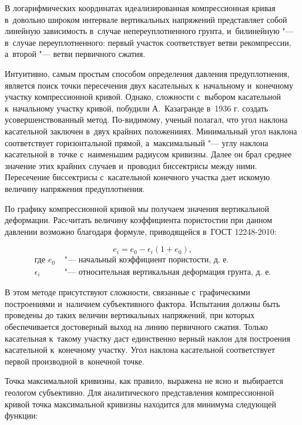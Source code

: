 В логарифмических координатах идеализированная компрессионная кривая в~довольно широком интервале вертикальных напряжений представляет собой линейную зависимость в~случае непереуплотненного грунта, и~билинейную "--- в~случае переуплотненного:
первый участок соответствует ветви рекомпрессии, а~второй "--- ветви первичного сжатия.

Интуитивно, самым простым способом определения давления предуплотнения, является поиск точки пересечения двух касательных к~начальному и~конечному участку компрессионной кривой. 
Однако, сложности с~выбором касательной к~начальному участку кривой, побудили А.~Казагранде в~1936 г. создать усовершенствованный метод. 
По-видимому, ученый полагал, что угол наклона касательной заключен в~двух крайних положенииях. 
Минимальный угол наклона соответствует горизонтальной прямой, а~максимальный "--- углу наклона касательной в~точке с~наименьшим радиусом кривизны. 
Далее он брал среднее значение этих крайних случаев и~проводил биссектрисы между ними. 
Пересечение биссектрисы с~касательной конечного участка дает искомую величину напряжения предуплотнения.

По графику компрессионной кривой мы получаем значения вертикальной деформации. Расcчитать величину коэффициента пористостии при данном давлении возможно благодаря формуле, приводящейся в~ГОСТ 12248-2010:

\begin{equation}
  \label{eq:void}
  e_i = e_0 - \epsilon_i (1+e_0),
\end{equation}
\begin{align*}
  \text{где }
  e_0 & 
  \text{ "--- начальный коэффициент пористости, д.~е.} \\
  \epsilon_i & 
  \text{ "--- относительная вертикальная деформация грунта, д.~е.}
\end{align*}


В этом методе присутствуют сложности, связанные с~графическими построениями и~наличием субъективного фактора.
Испытания должны быть проведены до таких величин вертикальных напряжений, при которых обеспечивается достоверный выход на линию первичного сжатия. 
Только касательная к~такому участку даст единственно верный наклон для построения касательной к~конечному участку.
Угол наклона касательной соответствует первой производной в~конечной точке.

Точка максимальной кривизны, как правило, выражена не ясно и~выбирается геологом субъективно. Для аналитического представления компрессионной кривой точка максимальной кривизны находится для минимума следующей функции:

